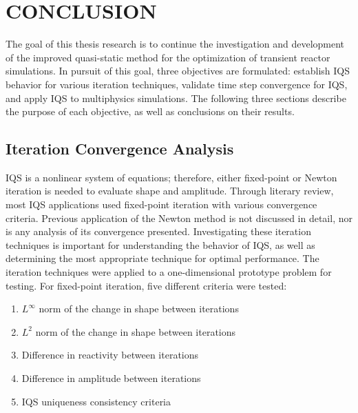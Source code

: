 %
%
%


\chapter{\uppercase{Conclusion}}

The goal of this thesis research is to continue the investigation and development of the improved quasi-static method for the optimization of transient reactor simulations. In pursuit of this goal, three objectives are formulated: establish IQS behavior for various iteration techniques, validate time step convergence for IQS, and apply IQS to multiphysics simulations. The following three sections describe the purpose of each objective, as well as conclusions on their results. 

\section{Iteration Convergence Analysis}

IQS is a nonlinear system of equations; therefore, either fixed-point or Newton iteration is needed to evaluate shape and amplitude. Through literary review, most IQS applications used fixed-point iteration with various convergence criteria. Previous application of the Newton method is not discussed in detail, nor is any analysis of its convergence presented. Investigating these iteration techniques is important for understanding the behavior of IQS, as well as determining the most appropriate technique for optimal performance. The iteration techniques were applied to a one-dimensional prototype problem for testing. For fixed-point iteration, five different criteria were tested: 

\begin{enumerate}
\item $L^\infty$ norm of the change in shape between iterations
\item $L^2$ norm of the change in shape between iterations
\item Difference in reactivity between iterations
\item Difference in amplitude between iterations
\item IQS uniqueness consistency criteria
\end{enumerate}


